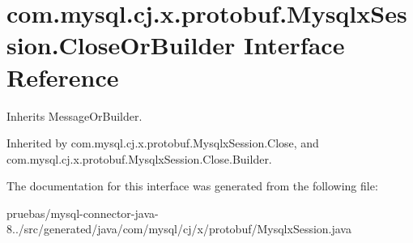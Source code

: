 \hypertarget{interfacecom_1_1mysql_1_1cj_1_1x_1_1protobuf_1_1_mysqlx_session_1_1_close_or_builder}{}\section{com.\+mysql.\+cj.\+x.\+protobuf.\+Mysqlx\+Session.\+Close\+Or\+Builder Interface Reference}
\label{interfacecom_1_1mysql_1_1cj_1_1x_1_1protobuf_1_1_mysqlx_session_1_1_close_or_builder}


Inherits Message\+Or\+Builder.



Inherited by com.\+mysql.\+cj.\+x.\+protobuf.\+Mysqlx\+Session.\+Close, and com.\+mysql.\+cj.\+x.\+protobuf.\+Mysqlx\+Session.\+Close.\+Builder.



The documentation for this interface was generated from the following file\+:\begin{DoxyCompactItemize}
\item 
pruebas/mysql-\/connector-\/java-\/8../src/generated/java/com/mysql/cj/x/protobuf/Mysqlx\+Session.\+java\end{DoxyCompactItemize}
